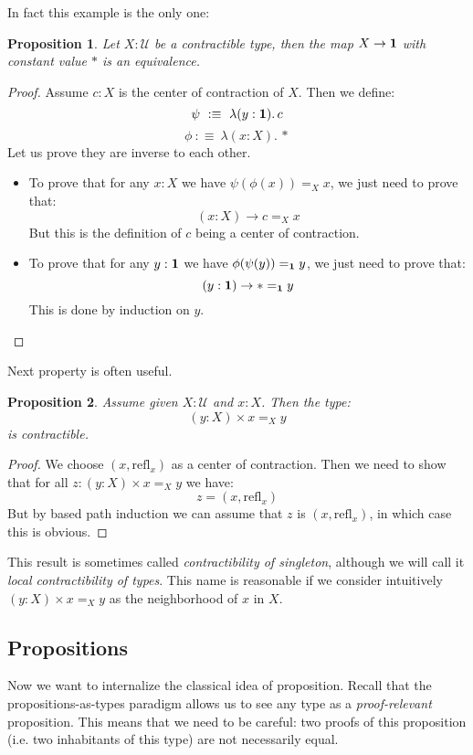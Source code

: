 \documentclass{article}
\newcommand{\sse}[1]{\medbreak \subsection{#1}}
\newcommand{\U}{{\mathcal U}}
\renewcommand{\r}{\rightarrow}
\newcommand{\Gl}{\lambda}
\newcommand{\refl}{\mathrm{refl}}
\newcommand{\one}{{\bf 1}}
\newtheorem{proposition}{Proposition}
\newtheorem{remark}{Remark}
\begin{document}
In fact this example is the only one:

\begin{proposition}
Let $X:\U$ be a contractible type, then the map $X\r \one$ with constant value $*$ is an equivalence.
\end{proposition}
\begin{proof}
Assume $c:X$ is the center of contraction of $X$. Then we define: 
\[\psi \ :\equiv \ \Gl (y:\one).\,c\]
\[\phi \ :\equiv\ \Gl(x:X).\,*\] 
Let us prove they are inverse to each other.
\begin{itemize}
\item To prove that for any $x:X$ we have $\psi(\phi(x)) =_X x$, we just need to prove that:
\[(x:X) \r c =_X x\]
But this is the definition of $c$ being a center of contraction.
\item To prove that for any $y:\one$ we have $\phi(\psi(y))=_\one y$, we just need to prove that:
\[(y:\one)\r *=_\one y\]
This is done by induction on $y$.
\end{itemize}
\end{proof}

Next property is often useful.

\begin{proposition}
Assume given $X:\U$ and $x:X$. Then the type: 
\[(y:X)\times x=_X y\]
is contractible.%
\end{proposition}
\begin{proof}
We choose $(x,\refl_x)$ as a center of contraction. Then we need to show that for all $z:(y:X)\times x=_X y$ we have: 
\[z=(x,\refl_x)\]
But by based path induction we can assume that $z$ is $(x,\refl_x)$, in which case this is obvious.
\end{proof}

This result is sometimes called \emph{contractibility of singleton}, although we will call it \emph{local contractibility of types}. This name is reasonable if we consider intuitively $(y:X)\times x=_X y$  as the neighborhood of $x$ in $X$. %



\sse{Propositions}

Now we want to internalize the classical idea of proposition. Recall that the propositions-as-types paradigm allows us to see any type as a \emph{proof-relevant} proposition. This means that we need to be careful: two proofs of this proposition (i.e. two inhabitants of this type) are not necessarily equal. 
\end{document}
